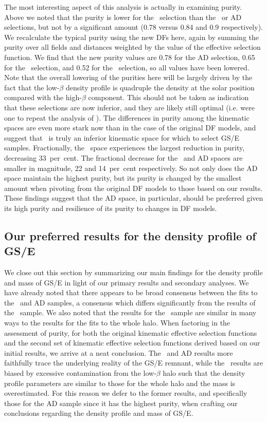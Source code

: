 The most interesting aspect of this analysis is actually in examining purity. Above we noted that the purity is lower for the \JRLz\ selection than the \eLz\ or AD selections, but not by a significant amount (0.78 versus 0.84 and 0.9 respectively). We recalculate the typical purity using the new DFs here, again by summing the purity over all fields and distances weighted by the value of the effective selection function. We find that the new purity values are 0.78 for the AD selection, 0.65 for the \eLz\ selection, and 0.52 for the \JRLz\ selection, so all values have been lowered. Note that the overall lowering of the purities here will be largely driven by the fact that the low-$\beta$ density profile is quadruple the density at the solar position compared with the high-$\beta$ component. This should not be taken as indication that these selections are now inferior, and they are likely still optimal (i.e. were one to repeat the analysis of \cite{lane22}). The differences in purity among the kinematic spaces are even more stark now than in the case of the original DF models, and suggest that \JRLz\ is truly an inferior kinematic space for which to select GS/E samples. Fractionally, the \JRLz\ space experiences the largest reduction in purity, decreasing 33~per~cent. The fractional decrease for the \eLz\ and AD spaces are smaller in magnitude, 22 and 14~per~cent respectively. So not only does the AD space maintain the highest purity, but its purity is changed by the smallest amount when pivoting from the original DF models to those based on our results. These findings suggest that the AD space, in particular, should be preferred given its high purity and resilience of its purity to changes in DF models.

\subsection{Our preferred results for the density profile of GS/E}

We close out this section by summarizing our main findings for the density profile and mass of GS/E in light of our primary results and secondary analyses. We have already noted that there appears to be broad consensus between the fits to the \eLz\ and AD samples, a consensus which differs significantly from the results of the \JRLz\ sample. We also noted that the results for the \JRLz\ sample are similar in many ways to the results for the fits to the whole halo. When factoring in the assessment of purity, for both the original kinematic effective selection functions and the second set of kinematic effective selection functions derived based on our initial results, we arrive at a neat conclusion. The \eLz\ and AD results more faithfully trace the underlying reality of the GS/E remnant, while the \JRLz\ results are biased by excessive contamination from the low-$\beta$ halo such that the density profile parameters are similar to those for the whole halo and the mass is overestimated. For this reason we defer to the former results, and specifically those for the AD sample since it has the highest purity, when crafting our conclusions regarding the density profile and mass of GS/E.

